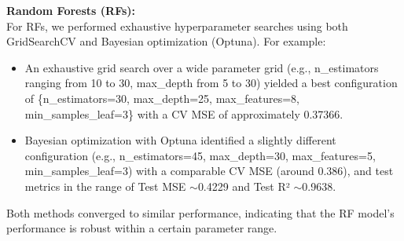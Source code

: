 \documentclass{article}
\begin{document}
\textbf{Random Forests (RFs):} \\
For RFs, we performed exhaustive hyperparameter searches using both GridSearchCV and Bayesian optimization (Optuna). For example:
\begin{itemize}
    \item An exhaustive grid search over a wide parameter grid (e.g., n\_estimators ranging from 10 to 30, max\_depth from 5 to 30) yielded a best configuration of \{n\_estimators=30, max\_depth=25, max\_features=8, min\_samples\_leaf=3\} with a CV MSE of approximately 0.37366.
    \item Bayesian optimization with Optuna identified a slightly different configuration (e.g., n\_estimators=45, max\_depth=30, max\_features=5, min\_samples\_leaf=3) with a comparable CV MSE (around 0.386), and test metrics in the range of Test MSE $\sim$0.4229 and Test R² $\sim$0.9638.
\end{itemize}
Both methods converged to similar performance, indicating that the RF model's performance is robust within a certain parameter range.
\end{document}
